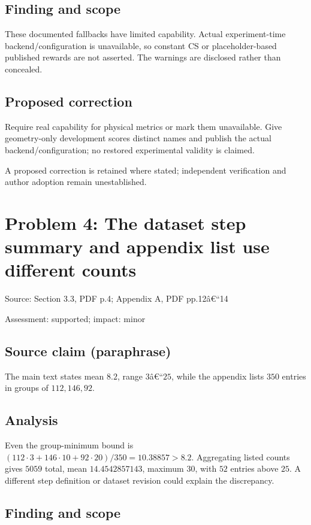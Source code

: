 \documentclass[11pt]{article}
\begin{document}
\subsection*{Finding and scope}

These documented fallbacks have limited capability. Actual experiment-time backend/configuration is unavailable, so constant CS or placeholder-based published rewards are not asserted. The warnings are disclosed rather than concealed.

\subsection*{Proposed correction}

Require real capability for physical metrics or mark them unavailable. Give geometry-only development scores distinct names and publish the actual backend/configuration; no restored experimental validity is claimed.

A proposed correction is retained where stated; independent verification and author adoption remain unestablished.

\section*{Problem 4: The dataset step summary and appendix list use different counts}

Source: Section 3.3, PDF p.4; Appendix A, PDF pp.12â€“14

Assessment: supported; impact: minor

\subsection*{Source claim (paraphrase)}

The main text states mean \(8.2\), range \(3\)â€“\(25\), while the appendix lists \(350\) entries in groups of \(112,146,92\).

\subsection*{Analysis}

Even the group-minimum bound is \((112\cdot3+146\cdot10+92\cdot20)/350=10.38857>8.2\). Aggregating listed counts gives \(5059\) total, mean \(14.4542857143\), maximum \(30\), with \(52\) entries above \(25\). A different step definition or dataset revision could explain the discrepancy.

\subsection*{Finding and scope}
\end{document}
